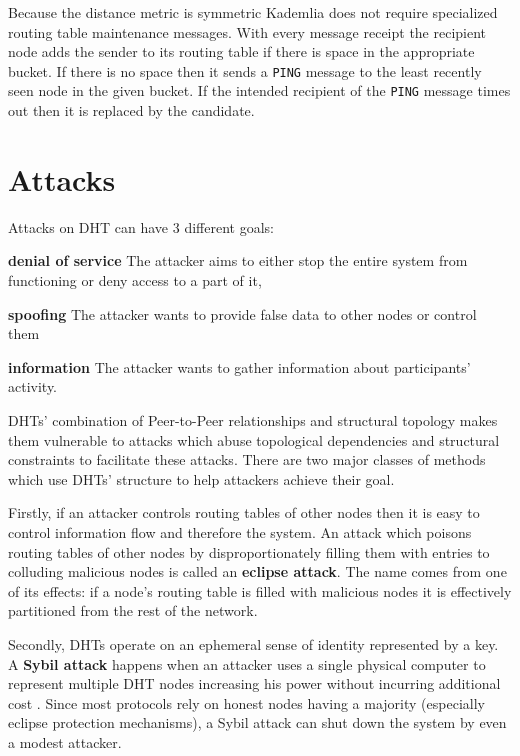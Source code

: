   Because the distance metric is symmetric Kademlia does not require specialized
  routing table maintenance messages. With every message receipt the recipient
  node adds the sender to its routing table if there is space in the appropriate
  bucket. If there is no space then it sends a \texttt{PING} message to the
  least recently seen node in the given bucket. If the intended recipient of the
  \texttt{PING} message times out then it is replaced by the candidate.

\section{Attacks}

  Attacks on DHT can have 3 different goals:
  \begin{description}
    \item{\textbf{denial of service}} The attacker aims to either stop the
      entire system from functioning or deny access to a part of it,
    \item{\textbf{spoofing}} The attacker wants to provide false data to other
      nodes or control them
    \item{\textbf{information}} The attacker wants to gather information about
      participants' activity.
  \end{description}

  DHTs' combination of Peer-to-Peer relationships and structural topology makes
  them vulnerable to attacks which abuse topological dependencies and structural
  constraints to facilitate these attacks. There are two major classes of
  methods which use DHTs' structure to help attackers achieve their goal.

  Firstly, if an attacker controls routing tables of other nodes then it is easy
  to control information flow and therefore the system. An attack which poisons
  routing tables of other nodes by disproportionately filling them with entries
  to colluding malicious nodes is called an \textbf{eclipse attack}. The name
  comes from one of its effects: if a node's routing table is filled with
  malicious nodes it is effectively partitioned from the rest of the network.

  Secondly, DHTs operate on an ephemeral sense of identity represented by a key.
  A \textbf{Sybil attack} happens when an attacker uses a single physical
  computer to represent multiple DHT nodes increasing his power without
  incurring additional cost \cite{dou02}. Since most protocols rely on honest
  nodes having a majority (especially eclipse protection mechanisms), a Sybil
  attack can shut down the system by even a modest attacker.

